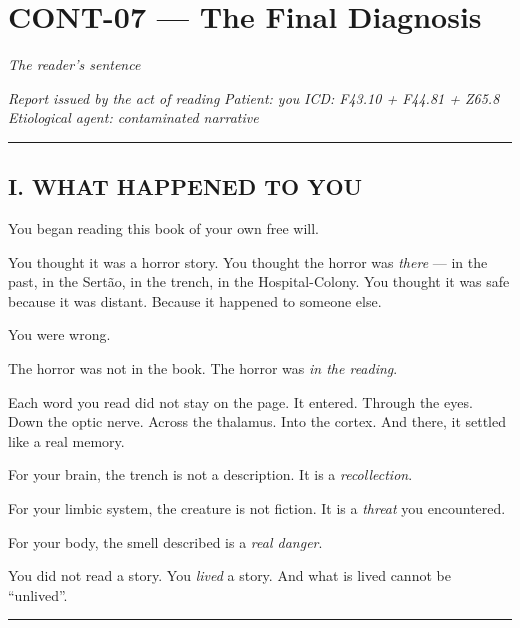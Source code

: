 \section*{\textbf{CONT-07} --- The Final Diagnosis}

\noindent \textit{The reader's sentence}

\noindent \textit{Report issued by the act of reading}
\textit{Patient: you}
\textit{ICD: F43.10 + F44.81 + Z65.8}
\textit{Etiological agent: contaminated narrative}

\vspace{0.5em}\noindent\rule{\textwidth}{0.5pt}\vspace{0.5em}

\subsection*{I. WHAT HAPPENED TO YOU}

\noindent You began reading this book of your own free will.

\noindent You thought it was a horror story. You thought the horror was \textit{there} --- in the past, in the Sertão, in the trench, in the Hospital-Colony. You thought it was safe because it was distant. Because it happened to someone else.

\noindent You were wrong.

\noindent The horror was not in the book.
The horror was \textit{in the reading}.

\noindent Each word you read did not stay on the page. It entered. Through the eyes. Down the optic nerve. Across the thalamus. Into the cortex. And there, it settled like a real memory.

\noindent For your brain, the trench is not a description. It is a \textit{recollection}.

\noindent For your limbic system, the creature is not fiction. It is a \textit{threat} you encountered.

\noindent For your body, the smell described is a \textit{real danger}.

\noindent You did not read a story.
You \textit{lived} a story.
And what is lived cannot be \textquotedblleft{}unlived\textquotedblright{}.

\vspace{0.5em}\noindent\rule{\textwidth}{0.5pt}\vspace{0.5em}

